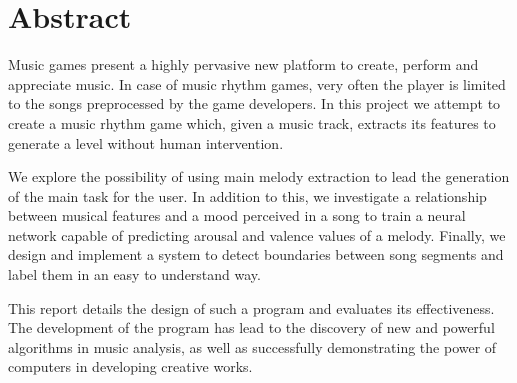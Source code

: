 
\chapter{Abstract} %

\label{Abstract} %


Music games present a highly pervasive new platform to create, perform and appreciate music. In case of music rhythm games, very often the player is limited to the songs preprocessed by the game developers. In this project we attempt to create a music rhythm game which, given a music track, extracts its features to generate a level without human intervention.

We explore the possibility of using main melody extraction to lead the generation of the main task for the user. In addition to this, we investigate a relationship between musical features and a mood perceived in a song to train a neural network capable of predicting arousal and valence values of a melody. Finally, we design and implement a system to detect boundaries between song segments and label them in an easy to understand way.

This report details the design of such a program and evaluates its effectiveness. The development of the program has lead to the discovery of new and powerful algorithms in music analysis, as well as successfully demonstrating the power of computers in developing creative works.


